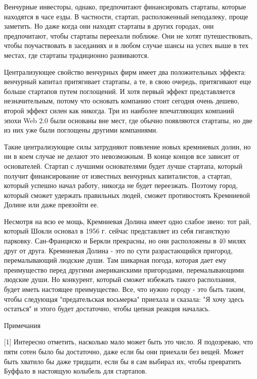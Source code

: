 \documentclass[ebook,12pt,oneside,openany]{memoir}
\begin{document}
Венчурные инвесторы, однако, предпочитают финансировать стартапы,
которые находятся в часе езды. В частности, стартап, расположенный
неподалеку, проще заметить. Но даже когда они находят стартапы в
других городах, они предпочитают, чтобы стартапы переехали поближе.
Они не хотят путешествовать, чтобы поучаствовать в заседаниях и в
любом случае шансы на успех выше в тех местах, где стартапы
традиционно развиваются.

Централизующее свойство венчурных фирм имеет два положительных
эффекта: венчурный капитал притягивает стартапы, а те, в свою очередь,
притягивают еще больше стартапов путем поглощений. И хотя первый
эффект представляется незначительным, потому что основать компанию
стоит сегодня очень дешево, второй эффект силен как никогда. Три из
наиболее впечатляющих компаний эпохи Web 2.0 были основаны вне мест,
где обычно появляются стартапы, но две из них уже были поглощены
другими компаниями.

Такие централизующие силы затрудняют появление новых кремниевых долин,
но ни в коем случае не делают это невозможным. В конце концов все
зависит от основателей. Стартап с лучшими основателями будет лучше
стартапа, который получит финансирование от известных венчурных
капиталистов, а стартап, который успешно начал работу, никогда не
будет переезжать. Поэтому город, который сможет удержать правильных
людей, сможет противостоять Кремниевой Долине или даже превзойти ее.

Несмотря на всю ее мощь, Кремниевая Долина имеет одно слабое звено:
тот рай, который Шокли основал в 1956 г. сейчас представляет из себя
гигансткую парковку. Сан-Франциско и Беркли прекрасны, но они
расположены в 40 милях друг от друга. Кремниевая Долина - это по сути
разрастающийся пригород, перемалывающий людские души. Там шикарная
погода, которая дает ему преимущество перед другими американскими
пригородами, перемалывающими людские души. Но конкурент, который
сможет избежать такого расползания, будет иметь настоящее
преимущество. Все, что нужно городу - это быть таким, чтобы следующая
"предательская восьмерка" приехала и сказала: "Я хочу здесь остаться"
и этого будет достаточно, чтобы цепная реакция началась.



Примечания

[1] Интересно отметить, насколько мало может быть это число. Я
подозреваю, что пяти сотен было бы достаточно, даже если бы они
приехали без вещей. Может быть хватило бы даже тридцати, если бы я сам
выбирал их, чтобы превратить Буффало в настоящую колыбель для
стартапов.
\end{document}
